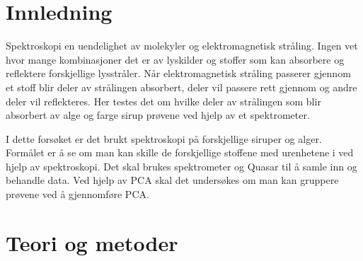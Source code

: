 \documentclass[twocolumn, 11pt]{article} %
\begin{document}
\section{Innledning} 


Spektroskopi en uendelighet av molekyler og elektromagnetisk stråling. Ingen vet hvor mange kombinasjoner det er av lyskilder og stoffer som kan absorbere og reflektere forskjellige lysstråler. Når elektromagnetisk stråling passerer gjennom et stoff blir deler av strålingen absorbert, deler vil passere rett gjennom og andre deler vil reflekteres. Her testes det om hvilke deler av strålingen som blir absorbert av alge og farge sirup prøvene ved hjelp av et spektrometer. 

I dette forsøket er det brukt spektroskopi på forskjellige siruper og alger. Formålet er å se om man kan skille de forskjellige stoffene med urenhetene i ved hjelp av spektroskopi. Det skal brukes spektrometer og Quasar til  å samle inn og behandle data. Ved hjelp av PCA skal det undersøkes om man kan gruppere prøvene ved å gjennomføre PCA.





\section{Teori og metoder}
\end{document}
